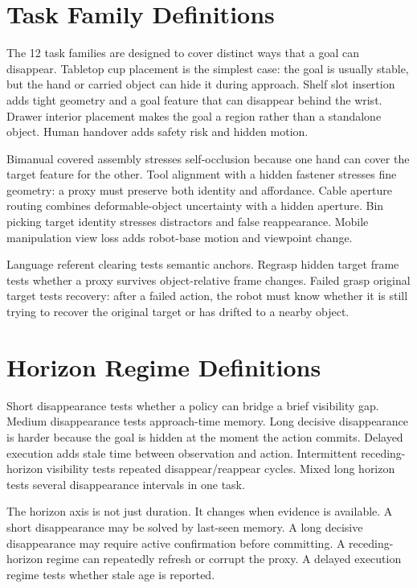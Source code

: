 \section{Task Family Definitions}

The 12 task families are designed to cover distinct ways that a goal can disappear. Tabletop cup placement is the simplest case: the goal is usually stable, but the hand or carried object can hide it during approach. Shelf slot insertion adds tight geometry and a goal feature that can disappear behind the wrist. Drawer interior placement makes the goal a region rather than a standalone object. Human handover adds safety risk and hidden motion.

Bimanual covered assembly stresses self-occlusion because one hand can cover the target feature for the other. Tool alignment with a hidden fastener stresses fine geometry: a proxy must preserve both identity and affordance. Cable aperture routing combines deformable-object uncertainty with a hidden aperture. Bin picking target identity stresses distractors and false reappearance. Mobile manipulation view loss adds robot-base motion and viewpoint change.

Language referent clearing tests semantic anchors. Regrasp hidden target frame tests whether a proxy survives object-relative frame changes. Failed grasp original target tests recovery: after a failed action, the robot must know whether it is still trying to recover the original target or has drifted to a nearby object.

\section{Horizon Regime Definitions}

Short disappearance tests whether a policy can bridge a brief visibility gap. Medium disappearance tests approach-time memory. Long decisive disappearance is harder because the goal is hidden at the moment the action commits. Delayed execution adds stale time between observation and action. Intermittent receding-horizon visibility tests repeated disappear/reappear cycles. Mixed long horizon tests several disappearance intervals in one task.

The horizon axis is not just duration. It changes when evidence is available. A short disappearance may be solved by last-seen memory. A long decisive disappearance may require active confirmation before committing. A receding-horizon regime can repeatedly refresh or corrupt the proxy. A delayed execution regime tests whether stale age is reported.

